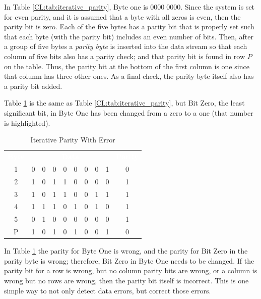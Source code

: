 In Table \ref{CL:tab:iterative_parity}, Byte one is $ 0000\;0000 $. Since the system is set for even parity, and it is assumed that a byte with all zeros is even, then the parity bit is zero. Each of the five bytes has a parity bit that is properly set such that each byte (with the parity bit) includes an even number of bits. Then, after a group of five bytes a \emph{parity byte} is inserted into the data stream so that each column of five bits also has a parity check; and that parity bit is found in row $ P $ on the table. Thus, the parity bit at the bottom of the first column is one since that column has three other ones. As a final check, the parity byte itself also has a parity bit added. 

Table \ref{CL:tab:iterative_parity_with_error} is the same as Table \ref{CL:tab:iterative_parity}, but Bit Zero, the least significant bit, in Byte One has been changed from a zero to a one (that number is highlighted).

\begin{table}[H]
  \sffamily
  \newcommand{\head}[1]{\textcolor{white}{\textbf{#1}}}    
  \begin{center}
    \begin{tabular}{cccccccccc} 
      \rowcolor{black!75}
      \head{Byte} & \multicolumn{8}{c}{\head{Data}} & \head{Parity} \\
      1 & 0 & 0 & 0 & 0 & 0 & 0 & 0 & \cellcolor{yellow!70!white}1 & 0 \\
      2 & 1 & 0 & 1 & 1 & 0 & 0 & 0 & 0 & 1 \\
      3 & 1 & 0 & 1 & 1 & 0 & 0 & 1 & 1 & 1 \\
      4 & 1 & 1 & 1 & 0 & 1 & 0 & 1 & 0 & 1 \\
      5 & 0 & 1 & 0 & 0 & 0 & 0 & 0 & 0 & 1 \\
      P & 1 & 0 & 1 & 0 & 1 & 0 & 0 & 1 & 0
    \end{tabular}
  \end{center}
  \caption{Iterative Parity With Error}
  \label{CL:tab:iterative_parity_with_error}
\end{table}

In Table \ref{CL:tab:iterative_parity_with_error} the parity for Byte One is wrong, and the parity for Bit Zero in the parity byte is wrong; therefore, Bit Zero in Byte One needs to be changed. If the parity bit for a row is wrong, but no column parity bits are wrong, or a column is wrong but no rows are wrong, then the parity bit itself is incorrect. This is one simple way to not only detect data errors, but correct those errors. 

